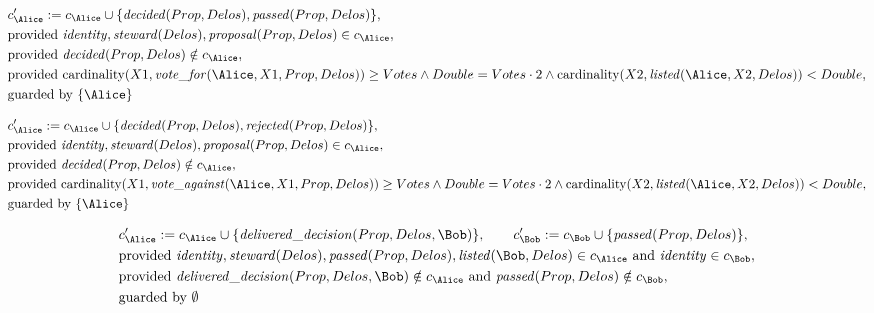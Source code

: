\begin{align*}
&
c'_
{
\Alice
}
 := 
c_
{
\Alice
}
 \cup 
\{
\mathit{\detokenize{
decided
}}
(
Prop
,
Delos
)
,
\mathit{\detokenize{
passed
}}
(
Prop
,
Delos
)
\}
,\\
&
\text{provided } 
\mathit{\detokenize{
identity
}}
,
\mathit{\detokenize{
steward
}}
(
Delos
)
,
\mathit{\detokenize{
proposal
}}
(
Prop
,
Delos
)
 \in c_
{
\Alice
}
,\\
&
\text{provided } 
\mathit{\detokenize{
decided
}}
(
Prop
,
Delos
)
 \notin c_
{
\Alice
}
,\\
&
\text{provided } 
\mathrm{cardinality}(
X1
,
\mathit{\detokenize{
vote_for
}}
(
\Alice
,
X1
,
Prop
,
Delos
)
)
\ge
Votes
\land
Double
=
Votes
\cdot
2
\land
\mathrm{cardinality}(
X2
,
\mathit{\detokenize{
listed
}}
(
\Alice
,
X2
,
Delos
)
)
<
Double
,\\
&
\text{guarded by } \{
\Alice
\}
\end{align*}

\begin{align*}
&
c'_
{
\Alice
}
 := 
c_
{
\Alice
}
 \cup 
\{
\mathit{\detokenize{
decided
}}
(
Prop
,
Delos
)
,
\mathit{\detokenize{
rejected
}}
(
Prop
,
Delos
)
\}
,\\
&
\text{provided } 
\mathit{\detokenize{
identity
}}
,
\mathit{\detokenize{
steward
}}
(
Delos
)
,
\mathit{\detokenize{
proposal
}}
(
Prop
,
Delos
)
 \in c_
{
\Alice
}
,\\
&
\text{provided } 
\mathit{\detokenize{
decided
}}
(
Prop
,
Delos
)
 \notin c_
{
\Alice
}
,\\
&
\text{provided } 
\mathrm{cardinality}(
X1
,
\mathit{\detokenize{
vote_against
}}
(
\Alice
,
X1
,
Prop
,
Delos
)
)
\ge
Votes
\land
Double
=
Votes
\cdot
2
\land
\mathrm{cardinality}(
X2
,
\mathit{\detokenize{
listed
}}
(
\Alice
,
X2
,
Delos
)
)
<
Double
,\\
&
\text{guarded by } \{
\Alice
\}
\end{align*}

\begin{align*}
&
c'_
{
\Alice
}
 := 
c_
{
\Alice
}
 \cup 
\{
\mathit{\detokenize{
delivered_decision
}}
(
Prop
,
Delos
,
\Bob
)
\}
, \qquad 
c'_
{
\Bob
}
 := 
c_
{
\Bob
}
 \cup 
\{
\mathit{\detokenize{
passed
}}
(
Prop
,
Delos
)
\}
,\\
&
\text{provided } 
\mathit{\detokenize{
identity
}}
,
\mathit{\detokenize{
steward
}}
(
Delos
)
,
\mathit{\detokenize{
passed
}}
(
Prop
,
Delos
)
,
\mathit{\detokenize{
listed
}}
(
\Bob
,
Delos
)
 \in c_
{
\Alice
}
 \text{ and } 
\mathit{\detokenize{
identity
}}
 \in c_
{
\Bob
}
,\\
&
\text{provided } 
\mathit{\detokenize{
delivered_decision
}}
(
Prop
,
Delos
,
\Bob
)
 \notin c_
{
\Alice
}
 \text{ and } 
\mathit{\detokenize{
passed
}}
(
Prop
,
Delos
)
 \notin c_
{
\Bob
}
,\\
&
\text{guarded by } \emptyset
\end{align*}
